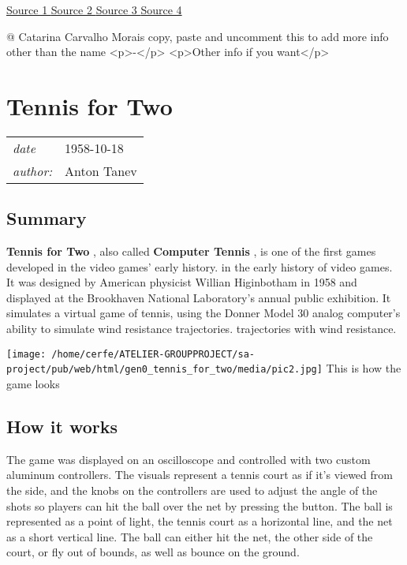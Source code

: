 \documentclass[a4paper,10pt]{book}
\newcommand{\pageHeader}[4]{
    \section{#1}
    \vspace{-0.3cm}
    \begin{table}[h!]
     \begin{tabular}{ll}
        \hline
        \textit{date} & #2 \\
        \textit{author: } & #3\\
        \hline
     \end{tabular}
    \end{table}
    \vspace{-0.3cm}
}
\begin{document}
 \href{https://en.wikipedia.org/wiki/Bertie_the_Brain}{Source 1 }
 \href{https://www.wikiwand.com/en/Bertie_the_Brain}{Source 2 }
 \href{http://spacing.ca/toronto/2014/08/13/meet-bertie-brain-worlds-first-arcade-game-built-toronto/}{Source 3 }
 \href{https://historyvgpodcast.wixsite.com/historyofvideogaming/games/bertie-the-brain}{Source 4 }
 
 
 
 @ Catarina Carvalho Morais 
  copy, paste and uncomment this to add more info other than the name
            <p>-</p>
            <p>Other info if you want</p>
           
 
 \newpage\pageHeader{Tennis for Two}{1958-10-18}{Anton Tanev}{A sports video game simulating a game of Tennis}
 \subsection{Summary }
 
 \textbf{Tennis for Two } , also called  \textbf{Computer Tennis } , is one of the first games developed in the video games' early history.
             in the early history of video games.  It was designed by American physicist Willian Higinbotham in 1958 and displayed at the
          Brookhaven National Laboratory's annual public exhibition. It simulates a virtual game of tennis, using
          the Donner Model 30 analog computer's ability to simulate wind resistance trajectories.  trajectories with wind resistance. 
 
 
 
 \texttt{[image: /home/cerfe/ATELIER-GROUPPROJECT/sa-project/pub/web/html/gen0\_tennis\_for\_two/media/pic2.jpg]}
 This is how the game looks 
 
 
 \subsection{How it works }
 
        The game was displayed on an oscilloscope and controlled with two custom aluminum controllers. The visuals
        represent a tennis court as if it's viewed from the side, and the knobs on the controllers are used to adjust
        the angle of the shots so players can hit the ball over the net by pressing the button. The ball is represented
        as a point of light, the tennis court as a horizontal line, and the net as a short vertical line. The ball
        can either hit the net, the other side of the court, or fly out of bounds, as well as bounce on the ground.
         
\end{document}
